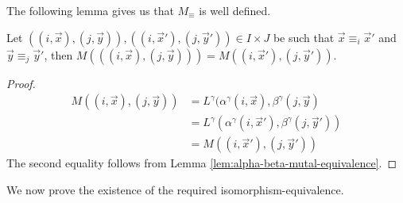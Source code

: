 \documentclass[../paper.tex]{subfiles}
\begin{document}
The following lemma gives us that $M_\equiv$ is well defined.

\begin{lem}
	Let $((i, \vec{x}), (j, \vec{y})), ((i, \vec{x}'), (j, \vec{y}')) \in I \times
  J$ be such that $\vec{x} \equiv_i \vec{x}'$ and $\vec{y} \equiv_j \vec{y}'$,
  then $M(((i, \vec{x}), (j, \vec{y}))) = M((i, \vec{x}'), (j, \vec{y}'))$.
	\label{lem:matrix-quot-well-defined}
\end{lem}
\begin{proof}
	\begin{align*}
		M((i, \vec{x}),(j, \vec{y})) & = L^{\gamma}(\alpha^{\gamma}(i, \vec{x}), \beta^{\gamma}(j, \vec{y})    \\
		                             & = L^{\gamma}(\alpha^{\gamma}(i, \vec{x}'), \beta^{\gamma}(j, \vec{y}')) \\
		                             & = M((i, \vec{x}'), (j, \vec{y}'))                                       
	\end{align*}
	The second equality follows from Lemma \ref{lem:alpha-beta-mutal-equivalence}.
\end{proof}

We now prove the existence of the required isomorphism-equivalence.
\end{document}

